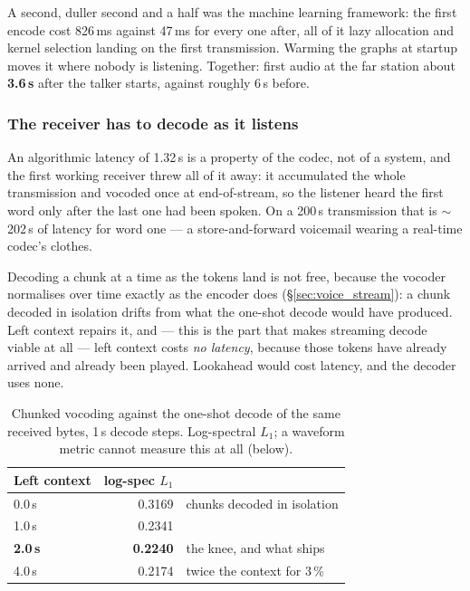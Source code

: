 A second, duller second and a half was the machine learning framework:
the first encode cost 826\,ms against 47\,ms for every one after, all of
it lazy allocation and kernel selection landing on the first
transmission.  Warming the graphs at startup moves it where nobody is
listening.  Together: first audio at the far station about
\textbf{3.6\,s} after the talker starts, against roughly 6\,s before.

\subsubsection{The receiver has to decode as it listens}
\label{sec:voice_decode}
An algorithmic latency of 1.32\,s is a property of the codec, not of a
system, and the first working receiver threw all of it away: it
accumulated the whole transmission and vocoded once at end-of-stream,
so the listener heard the first word only after the last one had been
spoken.  On a 200\,s transmission that is $\sim$202\,s of latency for
word one --- a store-and-forward voicemail wearing a real-time
codec's clothes.

Decoding a chunk at a time as the tokens land is not free, because the
vocoder normalises over time exactly as the encoder does
(\S\ref{sec:voice_stream}): a chunk decoded in isolation drifts from
what the one-shot decode would have produced.  Left context repairs it,
and --- this is the part that makes streaming decode viable at all ---
left context costs \emph{no latency}, because those tokens have already
arrived and already been played.  Lookahead would cost latency, and the
decoder uses none.

\begin{table}[H]
    \centering
    \caption{Chunked vocoding against the one-shot decode of the same
             received bytes, 1\,s decode steps.  Log-spectral $L_1$; a
             waveform metric cannot measure this at all (below).}
    \label{tab:voice_decctx}
    \small
    \begin{tabular}{@{}lrl@{}}
    \toprule
    \textbf{Left context} & \textbf{log-spec $L_1$} & \\
    \midrule
    0.0\,s & 0.3169 & chunks decoded in isolation \\
    1.0\,s & 0.2341 & \\
    \textbf{2.0\,s} & \textbf{0.2240} & the knee, and what ships \\
    4.0\,s & 0.2174 & twice the context for 3\,\% \\
    \bottomrule
    \end{tabular}
\end{table}

